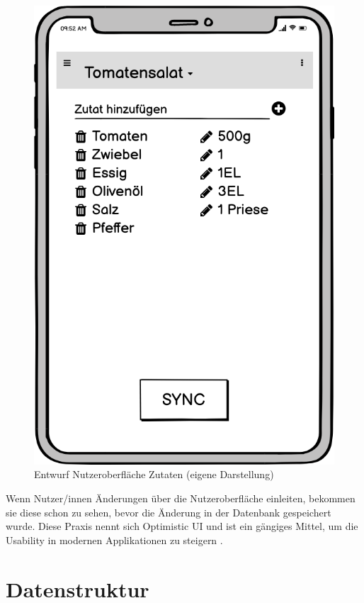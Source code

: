 \documentclass[a4paper, 12pt]{scrreprt}
\begin{document}
\begin{figure}[H]
\begin{minipage}{.45\textwidth}
		\includegraphics[width=1\textwidth]{wireframeZutaten2.png}
		\caption[Entwurf Nutzeroberfläche Zutaten]{Entwurf Nutzeroberfläche Zutaten (eigene Darstellung)}
		\label{fig:zutatenFrame}
	\end{minipage}
\end{figure}

\label{sec:optimisticUI}
Wenn Nutzer/innen Änderungen über die Nutzeroberfläche einleiten, bekommen sie diese schon zu sehen, bevor die Änderung in der Datenbank gespeichert wurde. Diese Praxis nennt sich Optimistic UI und ist ein gängiges Mittel, um die Usability in modernen Applikationen zu steigern \autocite{ArticleOptimisticUI}.

\section{Datenstruktur}
\label{sec:Datenstruktur}
\end{document}
